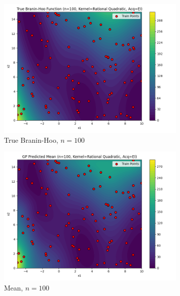 \documentclass[a4paper,12pt]{article}
\begin{document}
\begin{figure}[H]
\begin{subfigure}{0.3\textwidth}
  \includegraphics[width=\linewidth]{Task-02/images/true_function_rational_quadratic_n100_EI.png}
  \caption{True Branin-Hoo, $n=100$}
\end{subfigure}
\begin{subfigure}{0.3\textwidth}
    \includegraphics[width=\linewidth]{Task-02/images/gp_mean_rational_quadratic_n100_EI.png}
    \caption{Mean, $n=100$}
\end{subfigure}
\begin{subfigure}{0.3\textwidth}

\end{subfigure}
\end{figure}
\end{document}
